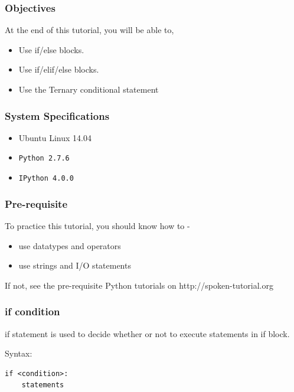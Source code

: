 \documentclass[17pt]{beamer}
\begin{document}
\begin{frame}
\frametitle{Objectives}
\label{sec-2}

  At the end of this tutorial, you will be able to,  \pause


\begin{itemize}
\item Use if/else blocks.\pause
\item Use if/elif/else blocks.\pause
\item Use the Ternary conditional statement
\end{itemize}
  
\end{frame}
\begin{frame}
\frametitle{System Specifications}\pause
\begin{itemize}
\item Ubuntu Linux 14.04\pause
\item \texttt{Python 2.7.6} \pause
\item \texttt{IPython 4.0.0}
\end{itemize}
\end{frame}
\begin{frame}
\frametitle{Pre-requisite}
\label{sec-3}

  To practice this tutorial, you should know how to -\pause

\begin{itemize}
\item use datatypes and operators\pause
\item use strings and I/O statements
\end{itemize}
If not, see the pre-requisite Python tutorials on {\color{blue}http://spoken-tutorial.org}
\end{frame}
\begin{frame}[fragile]
\frametitle{if condition}
if statement is used to decide
whether or not to execute statements in if block.\\\pause

Syntax:

\lstset{language=Python}
\begin{lstlisting}
if <condition>:
    statements
\end{lstlisting}
\end{frame}
\end{document}
